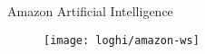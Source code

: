 %
\begin{frame}[t]{Amazon Artificial Intelligence}
	\begin{figure}[!h]
	\centering
	\vfill
	\texttt{[image: loghi/amazon-ws]}
	\vfill
	\end{figure}
\end{frame}
%
